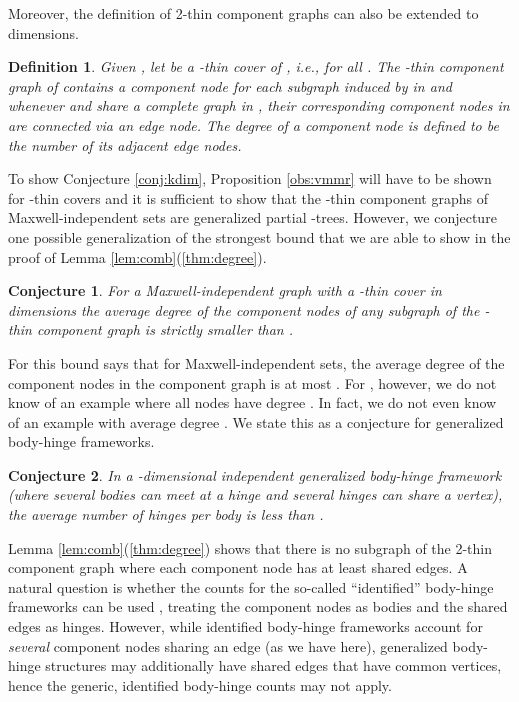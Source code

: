 \documentclass[10pt]{article}
\newtheorem{dfn}{Definition}
\newtheorem{conjecture}{Conjecture}
\begin{document}
\medskip\noindent
Moreover, the definition of 2-thin component graphs can also be extended to  dimensions.

\begin{dfn}\label{dfn:dDimcomponentGraph}
Given , let    be a -thin cover of , i.e.,    for all . The {\em -thin component graph}  of  contains a {\em component node} for each subgraph induced by  in  and whenever  and  share
a complete graph  in , their corresponding component nodes in  are connected via an {\em edge
node}. The {\em degree} of a component node is defined to be the number of its adjacent edge nodes.
\end{dfn}

\medskip\noindent
To show Conjecture \ref{conj:kdim}, Proposition \ref{obs:vmmr} will have to be shown for -thin covers and it is sufficient to show that the  -thin component graphs of Maxwell-independent
sets are generalized partial -trees. However, we conjecture one possible generalization of the
strongest bound that we are able to show in the proof of Lemma \ref{lem:comb}(\ref{thm:degree}).

\begin{conjecture}\label{conj:kdimTree}
For a Maxwell-independent graph with a -thin cover  in  dimensions
the average degree of the component nodes of any subgraph of the -thin component graph is strictly
smaller than .
\end{conjecture}

For  this bound says that for Maxwell-independent sets, the average degree of the component nodes in the component graph is at most . For , however, we do not know of an example where all nodes have degree . In fact, we do not even know of an example with average degree . We state this as a conjecture for generalized body-hinge frameworks.
 
 \begin{conjecture}\label{conj:bodyhinge}
 In a -dimensional independent generalized body-hinge framework (where several bodies can meet at a hinge and several hinges can share a vertex), the average number of hinges per body is less than .
 \end{conjecture}
 
 
\medskip\noindent
 Lemma \ref{lem:comb}(\ref{thm:degree}) shows that there is no subgraph of the 2-thin component graph where each
 component node has at least  shared edges.
 A natural question is whether the counts for the so-called ``identified'' body-hinge
 frameworks can be used \cite{tay:rigidity1984, WhWh87,KatohTanigawa2009, Tanigawa:2012}, treating the component nodes as bodies
 and the shared edges as hinges. However, while identified body-hinge
 frameworks account for {\em several} component nodes sharing an edge (as we have here), generalized body-hinge structures may additionally have shared edges that have common vertices, hence the
 generic, identified body-hinge counts may not apply.
\end{document}
